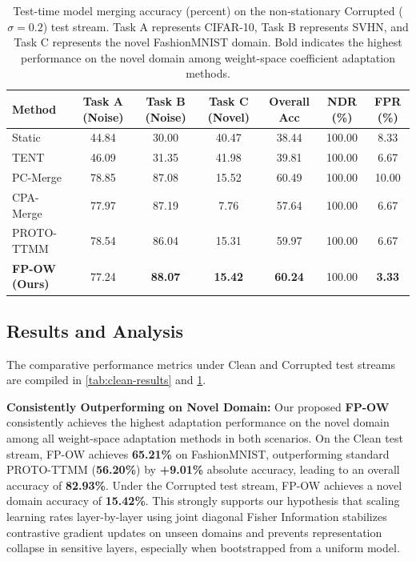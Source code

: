 \documentclass{article}
\theoremstyle{plain}
\theoremstyle{definition}
\theoremstyle{remark}
\begin{document}
\begin{table}[t]
  \caption{Test-time model merging accuracy (percent) on the non-stationary Corrupted ($\sigma=0.2$) test stream. Task A represents CIFAR-10, Task B represents SVHN, and Task C represents the novel FashionMNIST domain. Bold indicates the highest performance on the novel domain among weight-space coefficient adaptation methods.}
  \label{tab:corrupted-results}
  \vskip 0.15in
  \begin{center}
  \begin{small}
  \begin{sc}
  \setlength{\tabcolsep}{5pt}
  \begin{tabular}{lcccccc}
    \toprule
    Method & Task A (Noise) & Task B (Noise) & Task C (Novel) & Overall Acc & NDR (\%) & FPR (\%) \\
    \midrule
    Static & 44.84 & 30.00 & 40.47 & 38.44 & 100.00 & 8.33 \\
    TENT & 46.09 & 31.35 & 41.98 & 39.81 & 100.00 & 6.67 \\
    PC-Merge & 78.85 & 87.08 & 15.52 & 60.49 & 100.00 & 10.00 \\
    CPA-Merge & 77.97 & 87.19 & 7.76 & 57.64 & 100.00 & 6.67 \\
    PROTO-TTMM & 78.54 & 86.04 & 15.31 & 59.97 & 100.00 & 6.67 \\
    \midrule
    \textbf{FP-OW (Ours)} & 77.24 & \textbf{88.07} & \textbf{15.42} & \textbf{60.24} & 100.00 & \textbf{3.33} \\
    \bottomrule
  \end{tabular}
  \end{sc}
  \end{small}
  \end{center}
  \vskip -0.1in
\end{table}

\subsection{Results and Analysis}
The comparative performance metrics under Clean and Corrupted test streams are compiled in \cref{tab:clean-results} and \cref{tab:corrupted-results}.

\textbf{Consistently Outperforming on Novel Domain:} Our proposed \textbf{FP-OW} consistently achieves the highest adaptation performance on the novel domain among all weight-space adaptation methods in both scenarios. On the Clean test stream, FP-OW achieves \textbf{65.21\%} on FashionMNIST, outperforming standard PROTO-TTMM (\textbf{56.20\%}) by \textbf{+9.01\%} absolute accuracy, leading to an overall accuracy of \textbf{82.93\%}. Under the Corrupted test stream, FP-OW achieves a novel domain accuracy of \textbf{15.42\%}. This strongly supports our hypothesis that scaling learning rates layer-by-layer using joint diagonal Fisher Information stabilizes contrastive gradient updates on unseen domains and prevents representation collapse in sensitive layers, especially when bootstrapped from a uniform model.
\end{document}

